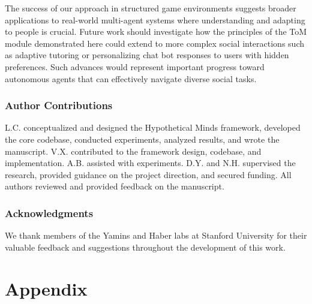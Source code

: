 \documentclass{article} %
\begin{document}
The success of our approach in structured game environments suggests broader applications to real-world multi-agent systems where understanding and adapting to people is crucial. Future work should investigate how the principles of the ToM module demonstrated here could extend to more complex social interactions such as adaptive tutoring or personalizing chat bot responses to users with hidden preferences. Such advances would represent important progress toward autonomous agents that can effectively navigate diverse social tasks.

\subsubsection*{Author Contributions}
L.C. conceptualized and designed the Hypothetical Minds framework, developed the core codebase, conducted experiments, analyzed results, and wrote the manuscript. V.X. contributed to the framework design, codebase, and implementation. A.B. assisted with experiments. D.Y. and N.H. supervised the research, provided guidance on the project direction, and secured funding. All authors reviewed and provided feedback on the manuscript.

\subsubsection*{Acknowledgments}
We thank members of the Yamins and Haber labs at Stanford University for their valuable feedback and suggestions throughout the development of this work.




\clearpage

\appendix
\section{Appendix}

\raggedbottom
\end{document}
